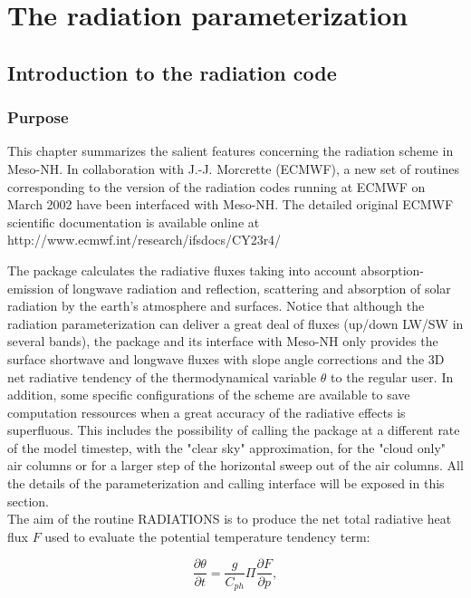 \chapter{The radiation parameterization}\label{RADIATIONS}
\minitoc
%
\section{Introduction to the radiation code}
%
\subsection{Purpose}
%

This chapter summarizes the salient features concerning 
the radiation scheme in Meso-NH. In collaboration with J.-J. Morcrette
(ECMWF), a new set of routines corresponding to the version
of the radiation codes running at ECMWF on March 2002 have been
interfaced with Meso-NH. The detailed original ECMWF scientific
documentation is available online at
http://www.ecmwf.int/research/ifsdocs/CY23r4/  

The package calculates the radiative fluxes taking into account
absorption-emission of longwave radiation and reflection, scattering and
absorption of solar radiation by the earth's atmosphere and surfaces.
Notice that although the radiation parameterization
can deliver a great deal of fluxes (up/down LW/SW in several bands), the
package and its interface with Meso-NH only provides the
surface shortwave and longwave fluxes with slope angle corrections and the 3D
net radiative tendency of the thermodynamical variable $\theta$ to the regular
user. In addition, some specific configurations of the scheme are available to save
computation ressources when a great accuracy of the radiative effects is
superfluous. This includes the possibility of calling the package at a different
rate of the model timestep, with the "clear sky" approximation, for the "cloud
only" air columns or for a larger step of the horizontal sweep out of the air
columns. All the details of the parameterization and calling interface will be
exposed in this section.\\

The aim of the routine RADIATIONS is to produce the net total radiative heat
flux $F$ used to evaluate the potential temperature tendency term:

$$\frac{\partial \theta}{\partial t} = \frac{g}{C_{ph}}\Pi \frac{\partial F}{\partial p}, $$

